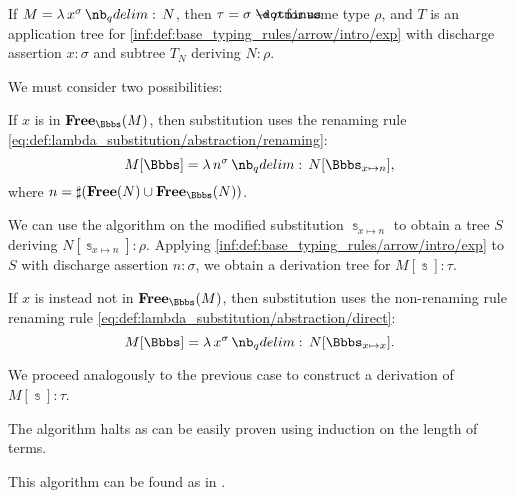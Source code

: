 \begin{algorithm}
\begin{thmenum}
     If \( M = \qabs {x^\sigma} N \), then \( \tau = \sigma \synimplies \rho \) for some type \( \rho \), and \( T \) is an application tree for \ref{inf:def:base_typing_rules/arrow/intro/exp} with discharge assertion \( x: \sigma \) and subtree \( T_N \) deriving \( N: \rho \).

    We must consider two possibilities:
    \begin{thmenum}
       If \( x \) is in \( \op*{Free}_\Bbbs(M) \), then substitution uses the renaming rule \eqref{eq:def:lambda_substitution/abstraction/renaming}:
      \begin{equation*}
        M[\Bbbs] = \qabs {n^\sigma} N[\Bbbs_{x \mapsto n}],
      \end{equation*}
      where \( n = \sharp(\op*{Free}(N) \cup \op*{Free}_\Bbbs(N)) \).

      We can use the algorithm on the modified substitution \( \Bbbs_{x \mapsto n} \) to obtain a tree \( S \) deriving \( N[\Bbbs_{x \mapsto n}]: \rho \). Applying \ref{inf:def:base_typing_rules/arrow/intro/exp} to \( S \) with discharge assertion \( n: \sigma \), we obtain a derivation tree for \( M[\Bbbs]: \tau \).

       If \( x \) is instead not in \( \op*{Free}_\Bbbs(M) \), then substitution uses the non-renaming rule renaming rule \eqref{eq:def:lambda_substitution/abstraction/direct}:
      \begin{equation*}
        M[\Bbbs] = \qabs {x^\sigma} N[\Bbbs_{x \mapsto x}].
      \end{equation*}

      We proceed analogously to the previous case to construct a derivation of \( M[\Bbbs]: \tau \).
    \end{thmenum}
  \end{thmenum}
\end{algorithm}
\begin{defproof}
  The algorithm halts as can be easily proven using induction on the length of terms.
\end{defproof}
\begin{comments}
  \item This algorithm can be found as  in \cite{notebook:code}.
\end{comments}


